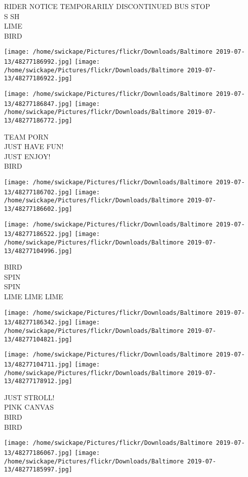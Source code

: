 \documentclass[10pt,letterpaper]{article}
\begin{document}
RIDER NOTICE TEMPORARILY DISCONTINUED BUS STOP\\
S SH\\
LIME\\
BIRD
\pagebreak

\texttt{[image: /home/swickape/Pictures/flickr/Downloads/Baltimore 2019-07-13/48277186992.jpg]}
\texttt{[image: /home/swickape/Pictures/flickr/Downloads/Baltimore 2019-07-13/48277186922.jpg]}

\texttt{[image: /home/swickape/Pictures/flickr/Downloads/Baltimore 2019-07-13/48277186847.jpg]}
\texttt{[image: /home/swickape/Pictures/flickr/Downloads/Baltimore 2019-07-13/48277186772.jpg]}

TEAM PORN\\
JUST HAVE FUN!\\
JUST ENJOY!\\
BIRD
\pagebreak

\texttt{[image: /home/swickape/Pictures/flickr/Downloads/Baltimore 2019-07-13/48277186702.jpg]}
\texttt{[image: /home/swickape/Pictures/flickr/Downloads/Baltimore 2019-07-13/48277186602.jpg]}

\texttt{[image: /home/swickape/Pictures/flickr/Downloads/Baltimore 2019-07-13/48277186522.jpg]}
\texttt{[image: /home/swickape/Pictures/flickr/Downloads/Baltimore 2019-07-13/48277104996.jpg]}

BIRD\\
SPIN\\
SPIN\\
LIME LIME LIME
\pagebreak

\texttt{[image: /home/swickape/Pictures/flickr/Downloads/Baltimore 2019-07-13/48277186342.jpg]}
\texttt{[image: /home/swickape/Pictures/flickr/Downloads/Baltimore 2019-07-13/48277104821.jpg]}

\texttt{[image: /home/swickape/Pictures/flickr/Downloads/Baltimore 2019-07-13/48277104711.jpg]}
\texttt{[image: /home/swickape/Pictures/flickr/Downloads/Baltimore 2019-07-13/48277178912.jpg]}

JUST STROLL!\\
PINK CANVAS\\
BIRD\\
BIRD
\pagebreak

\texttt{[image: /home/swickape/Pictures/flickr/Downloads/Baltimore 2019-07-13/48277186067.jpg]}
\texttt{[image: /home/swickape/Pictures/flickr/Downloads/Baltimore 2019-07-13/48277185997.jpg]}
\end{document}
